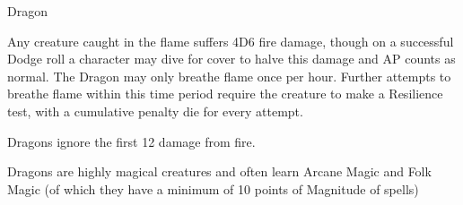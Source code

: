 \begin{monsterbox}{Dragon}
\begin{rpg-monsteraction}
		Any creature caught in the flame suffers 4D6 fire damage, though on a successful Dodge roll a character may dive for cover to halve this damage and AP counts as normal.
		The Dragon may only breathe flame once per hour. Further attempts to breathe flame within this time period require the creature to make a Resilience test, with a cumulative penalty die for every attempt.
	\end{rpg-monsteraction}
	\begin{rpg-monsteraction}
		Dragons ignore the first 12 damage from fire.
	\end{rpg-monsteraction}
	\begin{rpg-monsteraction}[Supernatural]
		Dragons are highly magical creatures and often learn Arcane Magic and Folk Magic (of which they have a minimum of 10 points of Magnitude of spells)
	\end{rpg-monsteraction}
\end{monsterbox}



